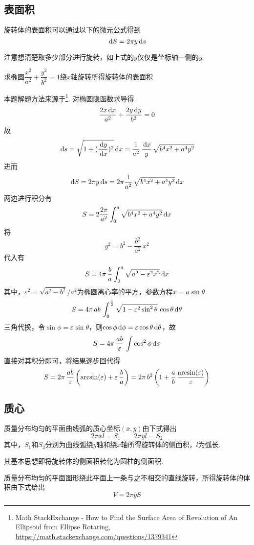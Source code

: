 \subsection{表面积}
旋转体的表面积可以通过以下的微元公式得到
\[\,\mathrm{d} S=2\pi y\,\mathrm{d} s\]
\par 注意想清楚取多少部分进行旋转，如上式的$y$仅仅是坐标轴一侧的$y$.
\begin{example}
求椭圆$\dfrac{x^2}{a^2}+\dfrac{y^2}{b^2}=1$绕$x$轴旋转所得旋转体的表面积
\end{example}
\begin{analysis}
本题解题方法来源于\footnote{Math StackExchange - How to Find the Surface Area of Revolution of An Ellipsoid from Ellipse Rotating, \url{https://math.stackexchange.com/questions/1379341}}.
对椭圆隐函数求导得
\[\frac{2x\,\mathrm{d} x}{a^2} + \frac{2y\,\mathrm{d} y}{b^2} = 0\]
故
\[\,\mathrm{d} s = \sqrt{1 + (\frac{\,\mathrm{d} y}{\,\mathrm{d} x})^2}\,\mathrm{d} x = \frac{1}{a^2}\,\frac{\,\mathrm{d} x}{y}\,\sqrt{b^4x^2 + a^4y^2}\]
进而
\[\,\mathrm{d} S = 2\pi y\,\mathrm{d} s=2\pi \frac{1}{a^2}\,\sqrt{b^4x^2 + a^4y^2}\,\mathrm{d} x\]
两边进行积分有
\[S = 2\frac{2\pi}{a^2}\int_{0}^{a} \sqrt{b^4x^2 + a^4y^2}\,\mathrm{d} x\]
将
\[y^2 = b^2 - \frac{b^2}{a^2}\,x^2\]
代入有
\[S = 4\pi\,\frac{b}{a}\int_{0}^{a} \sqrt{a^2 - \varepsilon^2x^2}\,\mathrm{d} x\]
其中，$\varepsilon^2=\sqrt{a^2-b^2}\Big/a^2$为椭圆离心率的平方，参数方程$x=a\sin\theta$
\[S = 4\pi\,ab\,\int_{0}^{\frac{\pi}{2}} \sqrt{1 - \varepsilon^2\sin^2\theta}\,\cos\theta\,\mathrm{d}\theta\]
三角代换，令$\sin\phi = \varepsilon\sin\theta$，则$\cos\phi\,\mathrm{d}\phi = \varepsilon\cos\theta\,\mathrm{d}\theta$，故
\[S = 4\pi\,\frac{ab}{\varepsilon}\,\int\cos^2\phi\,\mathrm{d}\phi\]
直接对其积分即可，将结果逐步回代得
\[S = 
2\pi\,\frac{ab}{\varepsilon}\left(\arcsin(\varepsilon) + \varepsilon\,\frac{b}{a}\right)= 
2\pi\,b^2\left(1 + \frac{a}{b}\,\frac{\arcsin(\varepsilon)}{\varepsilon}\right)\]
\end{analysis}

\subsection{质心}
\begin{theorem}
质量分布均匀的平面曲线弧的质心坐标$(\bar{x},\bar{y})$由下式得出
\[2\pi\bar{x}l=S_1\qquad 2\pi\bar{y}l=S_2\]
其中，$S_1$和$S_2$分别为曲线弧绕$y$轴和绕$x$轴所得旋转体的侧面积，$l$为弧长.
\end{theorem}
其基本思想即将旋转体的侧面积转化为圆柱的侧面积.
\begin{theorem}[古鲁金第二定理]
质量分布均匀的平面图形绕此平面上一条与之不相交的直线旋转，所得旋转体的体积由下式给出
\[V=2\pi\bar{y}S\]
\end{theorem}